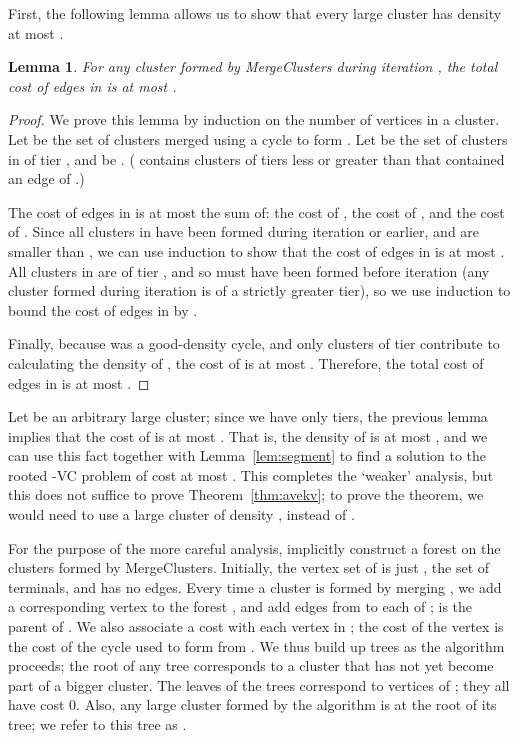 \documentclass[11pt]{article}
\newtheorem{lemma}{Lemma}[section]
\newcommand{\kvc}[1]{-{\sc VC} }
\newcommand{\kv}{\kvc{2}}
\begin{document}
First, the following lemma allows us to show that every large cluster
has density at most .

\begin{lemma} \label{lem:tierCost}
  For any cluster  formed by {\sc MergeClusters} during iteration ,
  the total cost of edges in  is at most .
\end{lemma}
\begin{proof}
  We prove this lemma by induction on the number of vertices in a
  cluster.  Let  be the set of clusters merged using a
  cycle  to form .  Let  be the set of clusters in
   of tier , and  be . ( contains clusters of tiers less or
  greater than  that contained an edge of .)

  The cost of edges in  is at most the sum of: the cost of , the
  cost of , and the cost of . Since all
  clusters in  have been formed during iteration  or
  earlier, and are smaller than , we can use induction to show that
  the cost of edges in  is at most . All clusters in  are of tier
  , and so must have been formed before iteration  (any cluster
  formed during iteration  is of a strictly greater tier), so we
  use induction to bound the cost of edges in  by .

  Finally, because  was a good-density cycle, and only clusters of
  tier  contribute to calculating the density of , the cost of
   is at most . Therefore,
  the total cost of edges in  is at most .
\end{proof}

\bigskip
Let  be an arbitrary large cluster; since we have only 
tiers, the previous lemma implies that the cost of  is at most
. That is, the
density of  is at most , and we can use this fact
together with Lemma~\ref{lem:segment} to find a solution to the rooted \kv
problem of cost at most . This completes the
`weaker' analysis, but this does not suffice to prove
Theorem~\ref{thm:avekv}; to prove the theorem, we would need to use a large
cluster  of density , instead of .

For the purpose of the more careful analysis, implicitly construct a
forest  on the clusters formed by {\sc
  MergeClusters}. Initially, the vertex set of  is just
, the set of terminals, and  has no edges. Every time a
cluster  is formed by merging  , we add a
corresponding vertex  to the forest , and add edges
from  to each of ;  is the parent of . We also associate a cost with each vertex in
; the cost of the vertex  is the cost of the cycle used
to form  from . We thus build up trees as the
algorithm proceeds; the root of any tree corresponds to a cluster that
has not yet become part of a bigger cluster. The leaves of the trees
correspond to vertices of ; they all have cost 0. Also, any large
cluster  formed by the algorithm is at the root of its tree; we
refer to this tree as .
\end{document}
